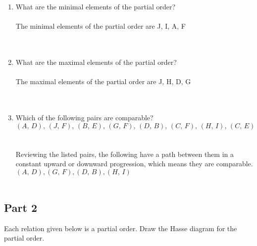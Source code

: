 \documentclass{amsart}
\theoremstyle{definition}
\theoremstyle{Exercise}
\theoremstyle{remark}
\theoremstyle{rule}
\numberwithin{equation}{section}
\begin{document}
\begin{enumerate}[label=(\alph*)]
\item What are the minimal elements of the partial order?\\\\
The minimal elements of the partial order are J, I, A, F\\
\\\\

\item What are the maximal elements of the partial order?\\\\
The maximal elements of the partial order are J, H, D, G\\
\\\\

\item Which of the following pairs are comparable?\\
\[
(A, \,D),\, (J,\, F),\, (B,\, E),\, (G, \,F),\, (D,\, B),\, (C, \,F),\, (H,\, I), \,(C,\, E)
\]\\\\
Reviewing the listed pairs, the following have a path between them in a constant upward or downward progression, which means they are comparable.
$(A,\,D), (G,\,F), (D,\,B), (H,\,I)$
\\\\

\end{enumerate}

\subsection*{Part 2}
Each relation given below is a partial order. Draw the Hasse diagram for the partial order.
\end{document}
